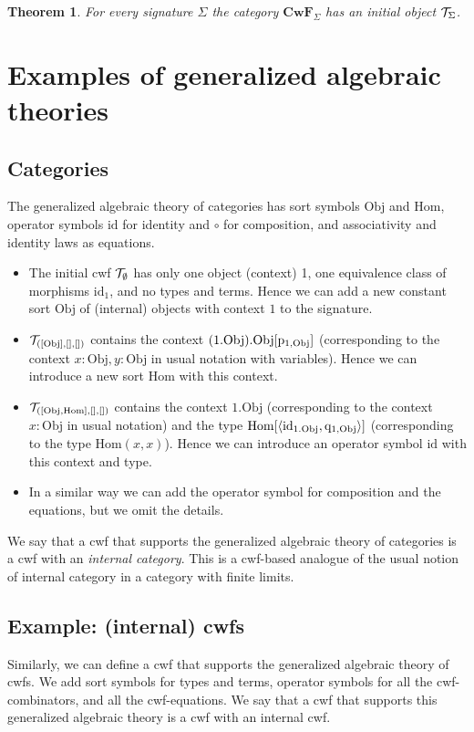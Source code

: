 \documentclass{lmcs}
\newtheorem{theorem}{Theorem}
\def\Cwf{\mathbf{CwF}}
\def\Obj{\mathrm{Obj}}
\def\Hom{\mathrm{Hom}}
\def\id{\mathrm{id}}
\begin{document}
\begin{theorem}
For every signature $\Sigma$ the category $\Cwf_\Sigma$ has an initial object ${\mathcal T}_\Sigma$.
\end{theorem}

\section{Examples of generalized algebraic theories}

\subsection{Categories} 
The generalized algebraic theory of categories has sort symbols $\Obj$ 
and $\Hom$, operator symbols $\id$ for identity and $\circ$ for composition, and associativity and identity laws as equations. 
\begin{itemize}
\item The initial cwf ${\mathcal T}_\emptyset$ has only one object (context) 1, one equivalence class of morphisms $\id_1$, and no types and terms. Hence we can add a new constant sort $\Obj$ of (internal) objects with context $1$ to the signature. 
\item $\T_{([\Obj],[],[])}$ contains the context $(1.\Obj).\Obj[\p_{1,\Obj}]$ (corresponding to the context $x : \Obj, y : \Obj$ in usual notation with variables). Hence we can introduce a new sort $\Hom$ with this context.
\item $\T_{([\Obj, \Hom],[],[])}$ contains the context $1.\Obj$ (corresponding to the context $x : \Obj$ in usual notation) and the type $\Hom[\tuple{\id_{1.\Obj},\q_{1,\Obj}}]$ (corresponding to the type $\Hom(x,x)$). Hence we can introduce an operator symbol $\id$ with this context and type.
\item In a similar way we can add the operator symbol for composition and the equations, but we omit the details.
\end{itemize}

We say that a cwf that supports the generalized algebraic theory of categories is a cwf with an {\em internal category}. This is a cwf-based analogue of the usual notion of internal category in a category with finite limits.

\subsection{Example: (internal) cwfs} Similarly, we can define a cwf that supports the generalized algebraic theory of cwfs. We add sort symbols for types and terms, operator symbols for all the cwf-combinators, and all the cwf-equations. We say that a cwf that supports this generalized algebraic theory is a cwf with an internal cwf.
\end{document}
